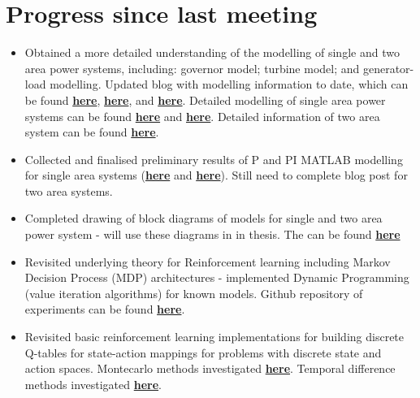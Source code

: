 \documentclass[12pt]{article}
\begin{document}
	\section{Progress since last meeting}
	\begin{itemize}
		\item Obtained a more detailed understanding of the modelling of single and two area power systems, including: governor model; turbine model; and generator-load modelling. Updated blog with modelling information to date, which can be found \href{https://skreynolds.github.io/blog/2020/03/09/modelling-plant-1}{\textbf{here}}, \href{https://skreynolds.github.io/blog/2020/03/10/modelling-plant-2}{\textbf{here}}, and \href{https://skreynolds.github.io/blog/2020/03/11/modelling-plant-3}{\textbf{here}}. Detailed modelling of single area power systems can be found \href{https://skreynolds.github.io/blog/2020/03/12/primary-control}{\textbf{here}} and \href{https://skreynolds.github.io/blog/2020/03/15/secondary-control}{\textbf{here}}. Detailed information of two area system can be found \href{https://skreynolds.github.io/blog/2020/03/22/two-area-power-system-modelling}{\textbf{here}}.
		\item Collected and finalised preliminary results of P and PI MATLAB modelling for single area systems (\href{https://skreynolds.github.io/blog/2020/03/19/single-area-p-control-frequency-domain}{\textbf{here}} and \href{https://skreynolds.github.io/blog/2020/03/21/single-area-pi-control-frequency-domain}{\textbf{here}}). Still need to complete blog post for two area systems.
		\item Completed drawing of block diagrams of models for single and two area power system - will use these diagrams in in thesis. The can be found \href{https://github.com/skreynolds/ENG720_honours_thesis/tree/master/05_figures}{\textbf{here}}
		\item Revisited underlying theory for Reinforcement learning including Markov Decision Process (MDP) architectures - implemented Dynamic Programming (value iteration algorithms) for known models. Github repository of experiments can be found \href{https://github.com/skreynolds/RLND_dynamic_programming}{\textbf{here}}.
		\item Revisited basic reinforcement learning implementations for building discrete Q-tables for state-action mappings for problems with discrete state and action spaces. Montecarlo methods investigated \href{https://github.com/skreynolds/RLND_monte_carlo_methods}{\textbf{here}}. Temporal difference methods investigated \href{https://github.com/skreynolds/RLND_temporal_difference_methods}{\textbf{here}}.

\end{itemize}
\end{document}
